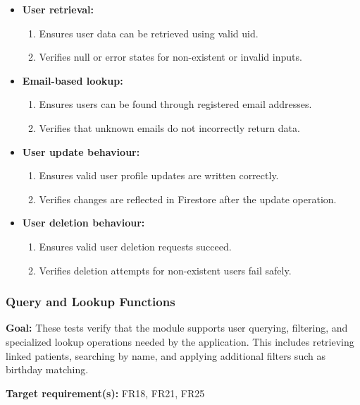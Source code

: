 \documentclass[12pt, titlepage]{article}
\begin{document}
\begin{itemize}
    \item \textbf{User retrieval:}
    \begin{enumerate}
        \item Ensures user data can be retrieved using valid uid.
        \item Verifies null or error states for non-existent or invalid inputs.
    \end{enumerate}

    \item \textbf{Email-based lookup:}
    \begin{enumerate}
        \item Ensures users can be found through registered email addresses.
        \item Verifies that unknown emails do not incorrectly return data.
    \end{enumerate}

    \item \textbf{User update behaviour:}
    \begin{enumerate}
        \item Ensures valid user profile updates are written correctly.
        \item Verifies changes are reflected in Firestore after the update operation.
    \end{enumerate}

    \item \textbf{User deletion behaviour:}
    \begin{enumerate}
        \item Ensures valid user deletion requests succeed.
        \item Verifies deletion attempts for non-existent users fail safely.
    \end{enumerate}
\end{itemize}


\subsubsection{Query and Lookup Functions}

\textbf{Goal:} These tests verify that the module supports user querying, filtering, and specialized lookup operations needed by the application. This includes retrieving linked patients, searching by name, and applying additional filters such as birthday matching.

\textbf{Target requirement(s):} FR18, FR21, FR25
\end{document}
